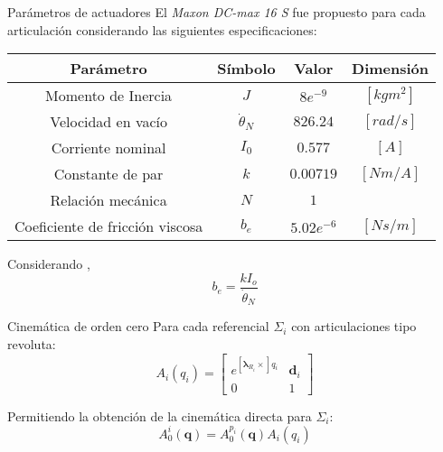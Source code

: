 \begin{frame}{Parámetros de actuadores}
    El \emph{Maxon DC-max 16 S} fue propuesto para cada articulación
    considerando las siguientes especificaciones:
    \begin{table}[H]
        \centering
        \begin{tabular}{cccc}
            Parámetro & Símbolo & Valor & Dimensión\\
            \hline \hline 
            Momento de Inercia & $J$ & $8e^{-9}$ & $[kgm^2]$\\ 
            Velocidad en vacío & $\dot{\theta}_N $ & $826.24$  & $[rad/s]$\\
            Corriente nominal & $I_0$ & $0.577$ & $[A]$\\
            Constante de par & $k$ & $0.00719$ & $[Nm/A]$ \\
            Relación mecánica & $N$ & $1$ &  \\
            Coeficiente de fricción viscosa & $b_e$ & $5.02e^{-6}$ &  $[Ns/m]$\\
        \end{tabular}
    \end{table}
    Considerando \cite{EcuacionFriccion}, 
    \begin{equation*}\label{Eqn:FricViscosa}
        b_e = \frac{kI_o}{\dot{\theta}_N} 
    \end{equation*}
\end{frame}

\begin{frame}{Cinemática de orden cero}
    Para cada referencial $\Sigma_i$ con articulaciones tipo revoluta:
    \begin{equation}
        A_i(q_i) = 
        \begin{bmatrix}
            e^{[\boldsymbol{\lambda}_{R_i}\times]q_i} & \boldsymbol{d}_{i}\\
            0 & 1
        \end{bmatrix}
        \label{eq:TH_GRYMA}
    \end{equation}
    
    Permitiendo la obtención de la cinemática directa para $\Sigma_i$:
    \begin{equation}
        A^i_0(\boldsymbol{q}) =  A^{p_i}_0(\boldsymbol{q}) A_i(q_i)
        \label{eq:CD}
    \end{equation}
\end{frame}

